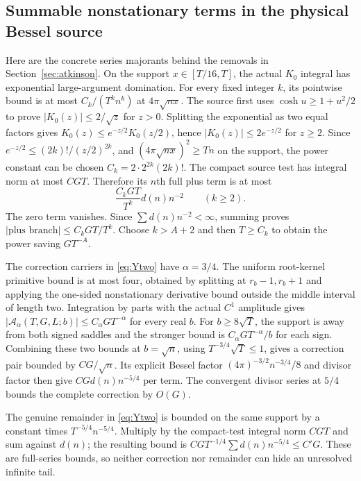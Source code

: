\documentclass[11pt,a4paper]{article}
\numberwithin{equation}{section}
\theoremstyle{definition}
\begin{document}
\subsection{Summable nonstationary terms in the physical Bessel source}
Here are the concrete series majorants behind the removals in
Section~\ref{sec:atkinson}.
On the support $x\in[T/16,T]$, the actual $K_0$ integral has exponential
large-argument domination. For every fixed integer $k$, its pointwise
bound is at most $C_k/(T^kn^k)$ at $4\pi\sqrt{nx}$.
The source first uses $\cosh u\ge1+u^2/2$ to prove
$|K_0(z)|\le2/\sqrt z$ for $z>0$.
Splitting the exponential as two equal factors gives
$K_0(z)\le e^{-z/2}K_0(z/2)$, hence $|K_0(z)|\le2e^{-z/2}$ for $z\ge2$.
Since $e^{-z/2}\le(2k)!/(z/2)^{2k}$, and
$(4\pi\sqrt{nx})^2\ge Tn$ on the support, the power constant can be chosen
$C_k=2\cdot2^{2k}(2k)!$. The compact source test has integral norm at most
$CGT$. Therefore its $n$th full plus term is at most
\[
 \frac{C_kGT}{T^k}d(n)n^{-2}\qquad(k\ge2).
\]
The zero term vanishes. Since $\sum d(n)n^{-2}<\infty$, summing proves
$|\text{plus branch}|\le C_kGT/T^k$. Choose $k>A+2$ and then $T\ge C_k$
to obtain the power saving $GT^{-A}$.

The correction carriers in \eqref{eq:Ytwo} have $\alpha=3/4$.
The uniform root-kernel primitive bound is at most four, obtained by splitting
at $r_b-1,r_b+1$ and applying the one-sided nonstationary derivative bound
outside the middle interval of length two. Integration by parts with the
actual $C^1$ amplitude gives
$|\mathcal A_\alpha(T,G,L;b)|\le C_\alpha GT^{-\alpha}$ for every real $b$.
For $b\ge8\sqrt T$, the support is away from both signed saddles and the
stronger bound is $C_\alpha GT^{-\alpha}/b$ for each sign.
Combining these two bounds at $b=\sqrt n$, using
$T^{-3/4}\sqrt T\le1$, gives a correction pair bounded by $CG/\sqrt n$.
Its explicit Bessel factor $(4\pi)^{-3/2}n^{-3/4}/8$ and divisor factor
then give $CGd(n)n^{-5/4}$ per term. The convergent divisor series at
$5/4$ bounds the complete correction by $O(G)$.

The genuine remainder in \eqref{eq:Ytwo} is bounded on the same support by a
constant times $T^{-5/4}n^{-5/4}$. Multiply by the compact-test integral norm
$CGT$ and sum against $d(n)$; the resulting bound is
$CGT^{-1/4}\sum d(n)n^{-5/4}\le C'G$. These are full-series bounds,
so neither correction nor remainder can hide an unresolved infinite tail.
\end{document}
